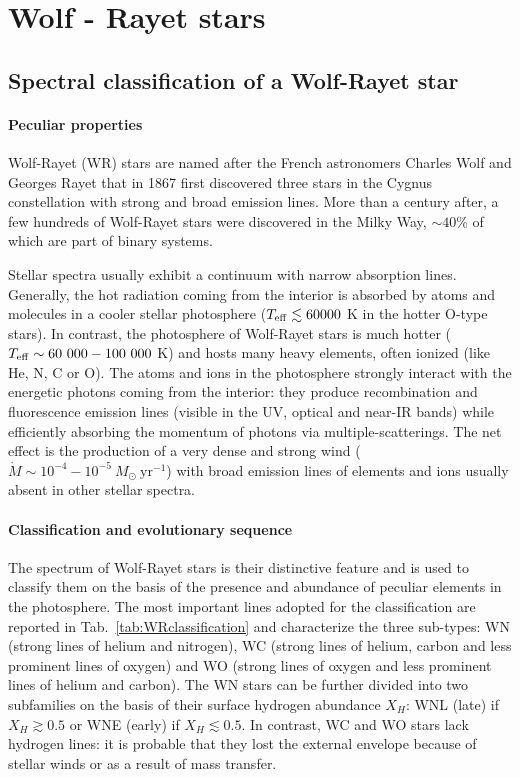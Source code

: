 \documentclass[a4paper,titlepage]{book}     	%
\newcommand{\sun}{\ensuremath{_\odot}}
\newcommand{\mdot}{\ensuremath{\dot{M}}}
\newcommand{\msun}{\ensuremath{M\sun}}
\newcommand{\yr}{\text{yr}}
\begin{document}
\section{Wolf - Rayet stars}
\subsection{Spectral classification of a Wolf-Rayet star}\label{subsec:WRclassification}
\paragraph{Peculiar properties} Wolf-Rayet (WR) stars are named after the French astronomers Charles Wolf and Georges Rayet that in 1867 first discovered three stars in the Cygnus constellation with strong and broad emission lines. More than a century after, a few hundreds of Wolf-Rayet stars were discovered in the Milky Way, $\sim 40 \%$ of which are part of binary systems.

Stellar spectra usually exhibit a continuum with narrow absorption lines. Generally, the hot radiation coming from the interior is absorbed by atoms and molecules in a cooler stellar photosphere ($T_{\rm eff} \lesssim 60 000$ K in the hotter O-type stars). In contrast, the photosphere of Wolf-Rayet stars is much hotter ($T_{\rm eff} \sim 60~000 - 100~000$ K) and hosts many heavy elements, often ionized (like He, N, C or O). The atoms and ions in the photosphere strongly interact with the energetic photons coming from the interior: they produce recombination and fluorescence emission lines (visible in the UV, optical and near-IR bands) while efficiently absorbing the momentum of photons via multiple-scatterings. The net effect is the production of a very dense and strong wind ($\mdot \sim 10^{-4}-10^{-5}~\msun~\yr^{-1}$) with broad emission lines of elements and ions usually absent in other stellar spectra.

\paragraph{Classification and evolutionary sequence}The spectrum of Wolf-Rayet stars is their distinctive feature and is used to classify them on the basis of the presence and abundance of peculiar elements in the photosphere. The most important lines adopted for the classification are reported in Tab.\ \ref{tab:WRclassification} and characterize the three sub-types: WN (strong lines of helium and nitrogen), WC (strong lines of helium, carbon and less prominent lines of oxygen) and WO (strong lines of oxygen and less prominent lines of helium and carbon). The WN stars can be further divided into two subfamilies on the basis of their surface hydrogen abundance $X_H$: WNL (late) if $X_H \gtrsim 0.5$ or WNE (early) if $X_H \lesssim 0.5$. In contrast, WC and WO stars lack hydrogen lines: it is probable that they lost the external envelope because of stellar winds or as a result of mass transfer.  
\end{document}
